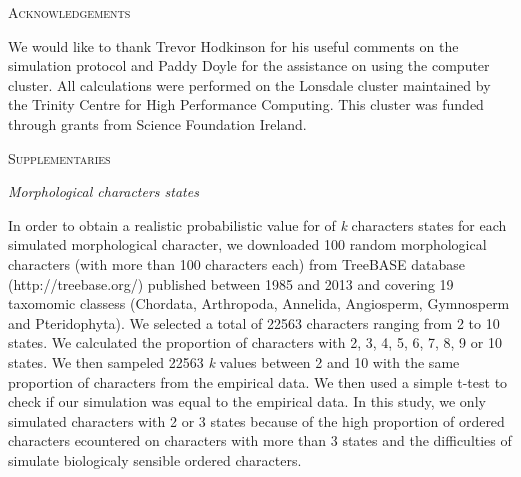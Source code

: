 \documentclass[12pt,letterpaper]{article}
\renewcommand{\section}[1]{%
\bigskip
\begin{center}
\begin{Large}
\normalfont\scshape #1
\medskip
\end{Large}
\end{center}}
\renewcommand{\subsection}[1]{%
\bigskip
\begin{center}
\begin{large}
\normalfont\itshape #1
\end{large}
\end{center}}
\begin{document}
\section{Acknowledgements}
We would like to thank Trevor Hodkinson %
for his useful comments on the simulation protocol and Paddy Doyle for the assistance on using the computer cluster.
All calculations were performed on the Lonsdale cluster maintained by the Trinity Centre for High Performance Computing.
This cluster was funded through grants from Science Foundation Ireland.



\section{Supplementaries}\label{supplementaries}
\subsection{Morphological characters states}
In order to obtain a realistic probabilistic value for of \textit{k} characters states for each simulated morphological character, we downloaded 100 random morphological characters (with more than 100 characters each) from TreeBASE database (http://treebase.org/) published between 1985 and 2013 and covering 19 taxomomic classess (Chordata, Arthropoda, Annelida, Angiosperm, Gymnosperm and Pteridophyta).
We selected a total of 22563 characters ranging from 2 to 10 states.
We calculated the proportion of characters with 2, 3, 4, 5, 6, 7, 8, 9 or 10 states.
We then sampeled 22563 \textit{k} values between 2 and 10 with the same proportion of characters from the empirical data.
We then used a simple t-test to check if our simulation was equal to the empirical data.
In this study, we only simulated characters with 2 or 3 states because of the high proportion of ordered characters ecountered on characters with more than 3 states and the difficulties of simulate biologicaly sensible ordered characters.
\end{document}
